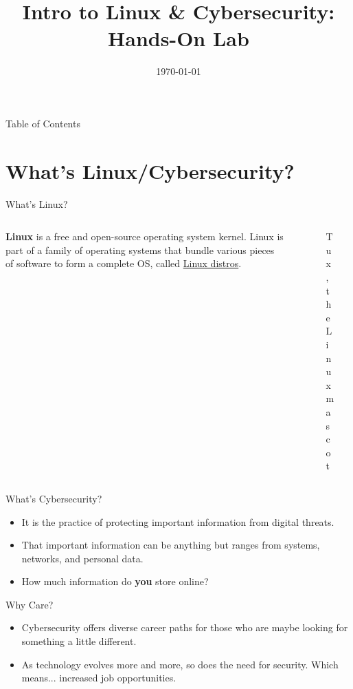 \documentclass{beamer}
\title{Intro to Linux \& Cybersecurity: Hands-On Lab}
\date{\today}
\institute{Linux Users Group @ UIC\\ WiCyS @ UIC}
\begin{document}
\begin{frame}
	\titlepage
\end{frame}

\begin{frame}{Table of Contents}
	\tableofcontents[pausesections]
\end{frame}

\section{What's Linux/Cybersecurity?}
\begin{frame}{What's Linux?}
	\begin{columns}
		\begin{column}{0.5\textwidth}
			\textbf{Linux} is a free and open-source operating
			system kernel. Linux is part of a family of operating
			systems that bundle various pieces of software to form
			a complete OS, called \underline{Linux distros}.
		\end{column}
		\begin{column}{0.5\textwidth}
			\begin{figure}
				\centering
				
				\caption{Tux, the Linux mascot}
			\end{figure}
		\end{column}
	\end{columns}
\end{frame}

\begin{frame}{What's Cybersecurity?}
	\begin{itemize}
		\item It is the practice of protecting important information
			from digital threats.
			\pause
		
		\item That important information can be anything but ranges
			from systems, networks, and personal data.
			\pause
		
		\item How much information do \textbf{you} store online?
	\end{itemize}
\end{frame}

\begin{frame}{Why Care?}
	\begin{itemize}
		\item Cybersecurity offers diverse career paths for those who
			are maybe looking for something a little different.
			\pause

		\item As technology evolves more and more, so does the need for
			security. Which means... increased job opportunities.
	\end{itemize}
\end{frame}
\end{document}
